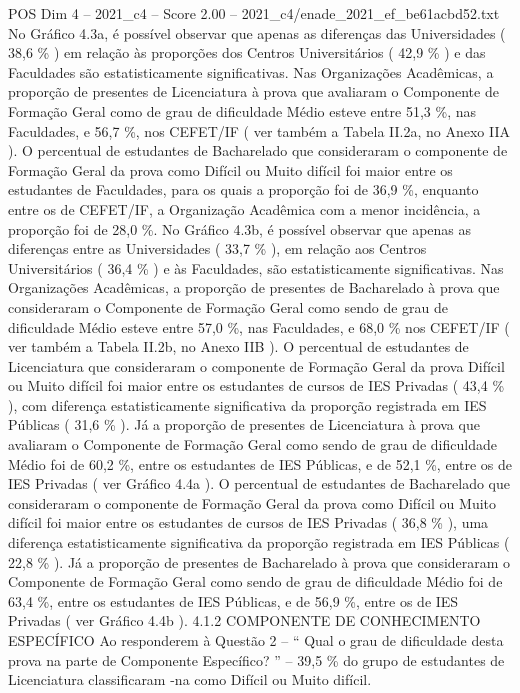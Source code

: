 \begin{textsample}{POS Dim 4 – 2021\_c4 – Score 2.00 – 2021\_c4/enade\_2021\_ef\_be61acbd52.txt}
No Gráfico 4.3a, é possível observar que apenas as diferenças das Universidades ( 38,6 \% ) em relação às proporções dos Centros Universitários ( 42,9 \% ) e das Faculdades são estatisticamente significativas.
Nas Organizações Acadêmicas, a proporção de presentes de Licenciatura à prova que avaliaram o Componente de Formação Geral como de grau de dificuldade Médio esteve entre 51,3 \%, nas Faculdades, e 56,7 \%, nos CEFET/IF ( ver também a Tabela II.2a, no Anexo IIA ).
O percentual de estudantes de Bacharelado que consideraram o componente de Formação Geral da prova como Difícil ou Muito difícil foi maior entre os estudantes de Faculdades, para os quais a proporção foi de 36,9 \%, enquanto entre os de CEFET/IF, a Organização Acadêmica com a menor incidência, a proporção foi de 28,0 \%.
No Gráfico 4.3b, é possível observar que apenas as diferenças entre as Universidades ( 33,7 \% ), em relação aos Centros Universitários ( 36,4 \% ) e às Faculdades, são estatisticamente significativas.
Nas Organizações Acadêmicas, a proporção de presentes de Bacharelado à prova que consideraram o Componente de Formação Geral como sendo de grau de dificuldade Médio esteve entre 57,0 \%, nas Faculdades, e 68,0 \% nos CEFET/IF ( ver também a Tabela II.2b, no Anexo IIB ).
O percentual de estudantes de Licenciatura que consideraram o componente de Formação Geral da prova Difícil ou Muito difícil foi maior entre os estudantes de cursos de IES Privadas ( 43,4 \% ), com diferença estatisticamente significativa da proporção registrada em IES Públicas ( 31,6 \% ).
Já a proporção de presentes de Licenciatura à prova que avaliaram o Componente de Formação Geral como sendo de grau de dificuldade Médio foi de 60,2 \%, entre os estudantes de IES Públicas, e de 52,1 \%, entre os de IES Privadas ( ver Gráfico 4.4a ).
O percentual de estudantes de Bacharelado que consideraram o componente de Formação Geral da prova como Difícil ou Muito difícil foi maior entre os estudantes de cursos de IES Privadas ( 36,8 \% ), uma diferença estatisticamente significativa da proporção registrada em IES Públicas ( 22,8 \% ).
Já a proporção de presentes de Bacharelado à prova que consideraram o Componente de Formação Geral como sendo de grau de dificuldade Médio foi de 63,4 \%, entre os estudantes de IES Públicas, e de 56,9 \%, entre os de IES Privadas ( ver Gráfico 4.4b ). 4.1.2 COMPONENTE DE CONHECIMENTO ESPECÍFICO Ao responderem à Questão 2 – “ Qual o grau de dificuldade desta prova na parte de Componente Específico? ” – 39,5 \% do grupo de estudantes de Licenciatura classificaram -na como Difícil ou Muito difícil.

\end{textsample}
